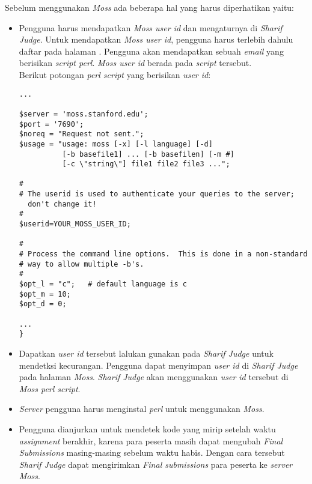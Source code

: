 Sebelum menggunakan \textit{Moss} ada beberapa hal yang harus diperhatikan yaitu:
\begin{itemize}
	\item Pengguna harus mendapatkan \textit{Moss user id} dan mengaturnya di \textit{Sharif Judge}. Untuk mendapatkan \textit{Moss user id}, pengguna harus terlebih dahulu daftar pada halaman . Pengguna akan mendapatkan sebuah \textit{email} yang berisikan \textit{script perl}. \textit{Moss user id} berada pada \textit{script} tersebut. \\
	Berikut potongan \textit{perl script} yang berisikan \textit{user id}:

\begin{lstlisting}[basicstyle=\ttfamily, frame=single,
columns=fullflexible, keepspaces=true, breaklines=true]
...

$server = 'moss.stanford.edu';
$port = '7690';
$noreq = "Request not sent.";
$usage = "usage: moss [-x] [-l language] [-d] 
		  [-b basefile1] ... [-b basefilen] [-m #] 
		  [-c \"string\"] file1 file2 file3 ...";

#
# The userid is used to authenticate your queries to the server; 
  don't change it!
#
$userid=YOUR_MOSS_USER_ID;

#
# Process the command line options.  This is done in a non-standard
# way to allow multiple -b's.
#
$opt_l = "c";   # default language is c
$opt_m = 10;
$opt_d = 0;

...
}

\end{lstlisting}

\item Dapatkan \textit{user id} tersebut lalukan gunakan pada \textit{Sharif Judge} untuk mendetksi kecurangan. Pengguna dapat menyimpan \textit{user id} di \textit{Sharif Judge} pada halaman \textit{Moss}. \textit{Sharif Judge} akan menggunakan \textit{user id} tersebut di \textit{Moss perl script}.

\item \textit{Server} pengguna harus menginstal \textit{perl} untuk menggunakan \textit{Moss}.

\item Pengguna dianjurkan untuk mendetek kode yang mirip setelah waktu \textit{assignment} berakhir, karena para peserta masih dapat mengubah \textit{Final Submissions} masing-masing sebelum waktu habis. Dengan cara tersebut \textit{Sharif Judge} dapat mengirimkan \textit{Final submissions} para peserta ke \textit{server Moss}.
\end{itemize}
